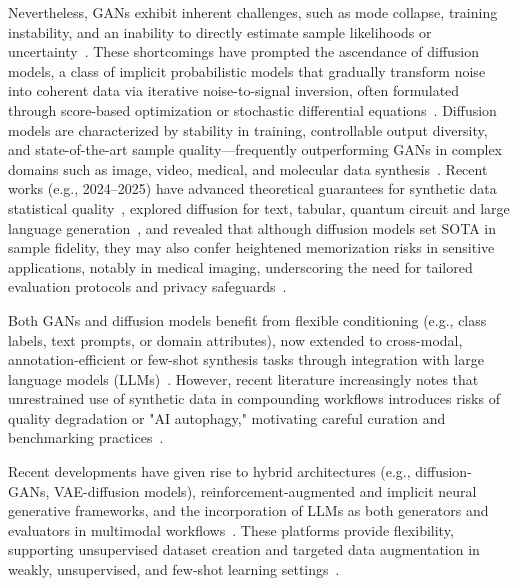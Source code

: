 \documentclass[sigconf]{acmart}
\begin{document}
Nevertheless, GANs exhibit inherent challenges, such as mode collapse, training instability, and an inability to directly estimate sample likelihoods or uncertainty~\cite{ref5,ref13,ref75,ref90,ref22,ref89}. These shortcomings have prompted the ascendance of diffusion models, a class of implicit probabilistic models that gradually transform noise into coherent data via iterative noise-to-signal inversion, often formulated through score-based optimization or stochastic differential equations~\cite{ref10,ref16,ref21,ref22,ref23,ref24,ref25,ref26,ref75,ref81,ref82,ref89}. Diffusion models are characterized by stability in training, controllable output diversity, and state-of-the-art sample quality---frequently outperforming GANs in complex domains such as image, video, medical, and molecular data synthesis~\cite{ref15,ref16,ref18,ref21,ref24,ref25,ref75,ref81,ref89,ref26}. Recent works (e.g., 2024--2025) have advanced theoretical guarantees for synthetic data statistical quality~\cite{ref10,ref24}, explored diffusion for text, tabular, quantum circuit and large language generation~\cite{ref1,ref14,ref16,ref25}, and revealed that although diffusion models set SOTA in sample fidelity, they may also confer heightened memorization risks in sensitive applications, notably in medical imaging, underscoring the need for tailored evaluation protocols and privacy safeguards~\cite{ref21,ref89}.

Both GANs and diffusion models benefit from flexible conditioning (e.g., class labels, text prompts, or domain attributes), now extended to cross-modal, annotation-efficient or few-shot synthesis tasks through integration with large language models (LLMs)~\cite{ref14,ref23,ref24,ref25,ref82,ref89,ref90}. However, recent literature increasingly notes that unrestrained use of synthetic data in compounding workflows introduces risks of quality degradation or "AI autophagy," motivating careful curation and benchmarking practices~\cite{ref82,ref89}.

Recent developments have given rise to hybrid architectures (e.g., diffusion-GANs, VAE-diffusion models), reinforcement-augmented and implicit neural generative frameworks, and the incorporation of LLMs as both generators and evaluators in multimodal workflows~\cite{ref2,ref6,ref13,ref16,ref18,ref22,ref23,ref25,ref82,ref89,ref90}. These platforms provide flexibility, supporting unsupervised dataset creation and targeted data augmentation in weakly, unsupervised, and few-shot learning settings~\cite{ref12,ref23,ref26,ref27,ref64,ref81}.
\end{document}
